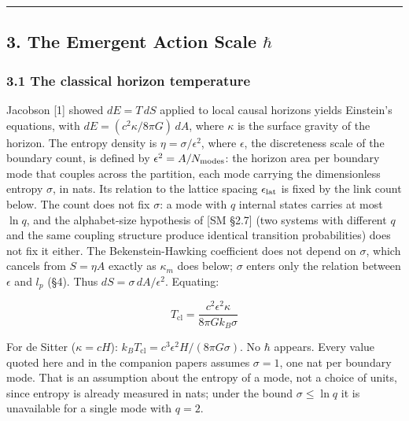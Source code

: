 \documentclass[
]{article}
\begin{document}
\begin{center}\rule{0.5\linewidth}{0.5pt}\end{center}

\hypertarget{the-emergent-action-scale-hbar}{%
\subsection{\texorpdfstring{3. The Emergent Action Scale
\(\hbar\)}{3. The Emergent Action Scale \textbackslash hbar}}\label{the-emergent-action-scale-hbar}}

\hypertarget{the-classical-horizon-temperature}{%
\subsubsection{3.1 The classical horizon
temperature}\label{the-classical-horizon-temperature}}

Jacobson {[}1{]} showed \(dE = T\,dS\) applied to local causal horizons
yields Einstein's equations, with \(dE = (c^2 \kappa / 8\pi G)\,dA\),
where \(\kappa\) is the surface gravity of the horizon. The entropy
density is \(\eta = \sigma/\epsilon^2\), where \(\epsilon\), the
discreteness scale of the boundary count, is defined by
\(\epsilon^2 = A/N_{\rm modes}\): the horizon area per boundary mode
that couples across the partition, each mode carrying the dimensionless
entropy \(\sigma\), in nats. Its relation to the lattice spacing
\(\epsilon_{\rm lat}\) is fixed by the link count below. The count does
not fix \(\sigma\): a mode with \(q\) internal states carries at most
\(\ln q\), and the alphabet-size hypothesis of {[}SM §2.7{]} (two
systems with different \(q\) and the same coupling structure produce
identical transition probabilities) does not fix it either. The
Bekenstein-Hawking coefficient does not depend on \(\sigma\), which
cancels from \(S = \eta A\) exactly as \(\kappa_m\) does below;
\(\sigma\) enters only the relation between \(\epsilon\) and \(l_p\)
(§4). Thus \(dS = \sigma\,dA/\epsilon^2\). Equating:

\[T_{\text{cl}} = \frac{c^2 \epsilon^2 \kappa}{8\pi G k_B \sigma}\]

For de Sitter (\(\kappa = cH\)):
\(k_B T_{\text{cl}} = c^3 \epsilon^2 H / (8\pi G \sigma)\). No \(\hbar\)
appears. Every value quoted here and in the companion papers assumes
\(\sigma = 1\), one nat per boundary mode. That is an assumption about
the entropy of a mode, not a choice of units, since entropy is already
measured in nats; under the bound \(\sigma \leq \ln q\) it is
unavailable for a single mode with \(q = 2\).
\end{document}
